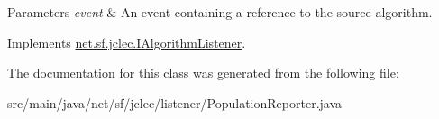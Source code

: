 \begin{DoxyParams}{Parameters}
{\em event} & An event containing a reference to the source algorithm. \\
\hline
\end{DoxyParams}


Implements \hyperlink{interfacenet_1_1sf_1_1jclec_1_1_i_algorithm_listener_a8f618b1d3650433ae2ad6cd3b96a643a}{net.\-sf.\-jclec.\-I\-Algorithm\-Listener}.



The documentation for this class was generated from the following file\-:\begin{DoxyCompactItemize}
\item 
src/main/java/net/sf/jclec/listener/Population\-Reporter.\-java\end{DoxyCompactItemize}
